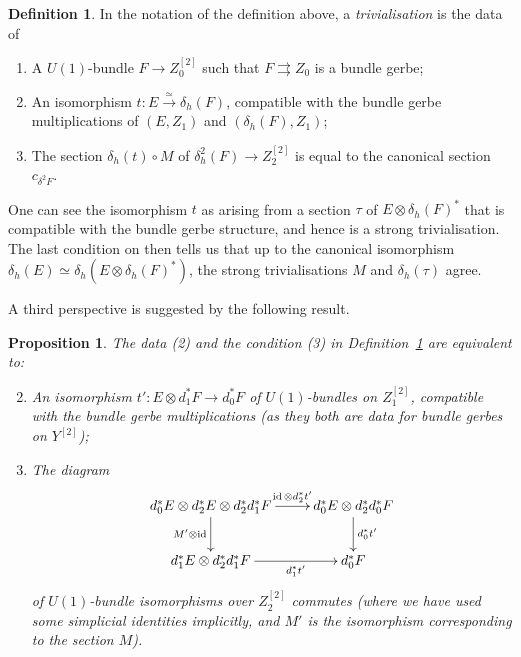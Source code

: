 \documentclass[12pt]{amsart}
\DeclareMathOperator{\id}{id}
\theoremstyle{plain}
\newtheorem{proposition}[theorem]{Proposition}
\theoremstyle{definition}
\newtheorem{definition}[theorem]{Definition}
\theoremstyle{remark}
\numberwithin{equation}{section}
\newcommand{\<}{\langle}
\renewcommand{\>}{\rangle}
\begin{document}
\begin{definition}\label{def:vsb2g_triv}
In the notation of the definition above, a \emph{trivialisation} is the data of 
\begin{enumerate}[(1)]
\item A $U(1)$-bundle $F \to Z_0^{[2]}$ such that $F\rightrightarrows Z_0$ is a bundle gerbe;
\item An isomorphism $t\colon E \xrightarrow{\simeq} \delta_h(F)$, compatible with the bundle gerbe multiplications of $(E,Z_1)$ and $(\delta_h(F),Z_1)$;
\item The section $\delta_h(t)\circ M$ of $\delta_h^2(F)\to Z_2^{[2]}$ is equal to the canonical section $c_{\delta^2F}$.
\end{enumerate}
\end{definition}

One can see the isomorphism $t$ as arising from a section $\tau$ of $E\otimes \delta_h(F)^*$ that is compatible with the bundle gerbe structure, and hence is a strong trivialisation. 
The last condition on then tells us that up to the canonical isomorphism $\delta_h(E)\simeq \delta_h(E\otimes \delta_h(F)^*)$, the strong trivialisations $M$ and $\delta_h(\tau)$ agree.

A third perspective is suggested by the following result.

\begin{proposition}\label{prop:module_version_of_rigid_triv}
The data  (2) and the condition (3) in Definition~\ref{def:vsb2g_triv} are equivalent to:
\begin{enumerate}[(1')]
 \setcounter{enumi}{1}
 \item An isomorphism $t'\colon E\otimes d_1^*F \to d_0^*F$ of $U(1)$-bundles on $Z_1^{[2]}$, compatible with the bundle gerbe multiplications (as they both are data for bundle gerbes on $Y^{[2]}$);

 \item The diagram
 \[
  \xymatrix{
    d_0^*E\otimes d_2^* E \otimes d_2^*d_1^*F \ar[r]^-{\id\otimes d_2^*t'} \ar[d]_{M'\otimes\id} & d_0^*E \otimes d_2^* d_0^* F \ar[d]^{d_0^*t'} \\
    d_1^* E\otimes d_2^* d_1^* F \ar[r]_-{d_1^*t'} & d_0^* F
  }
 \]
 of $U(1)$-bundle isomorphisms over $Z_2^{[2]}$ commutes (where we have used some simplicial identities implicitly, and $M'$ is the isomorphism corresponding to the section $M$).
\end{enumerate}
\end{proposition}
\end{document}

